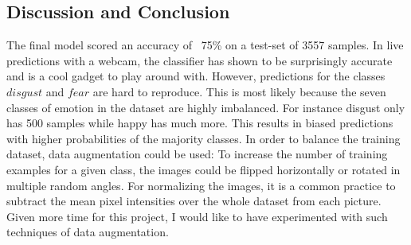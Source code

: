 \documentclass[twoside]{article}
\begin{document}
\begin{multicols}{2}
\section{Discussion and Conclusion}

The final model scored an accuracy of ~75\% on a test-set of 3557 samples. In live predictions with a webcam, the classifier has shown to be surprisingly accurate and is a cool gadget to play around with. However, predictions for the classes $disgust$ and $fear$ are hard to reproduce. This is most likely because the seven classes of emotion in the dataset are highly imbalanced. For instance disgust only has 500 samples while happy has much more. This results in biased predictions with higher probabilities of the majority classes. In order to balance the training dataset, data augmentation could be used: To increase the number of training examples for a given class, the images could be flipped horizontally or rotated in multiple random angles. For normalizing the images, it is a common practice to subtract the mean pixel intensities over the whole dataset from each picture. Given more time for this project, I would like to have experimented with such techniques of data augmentation. 




%
%
%	
%    
%
% 






\end{multicols}
\end{document}
